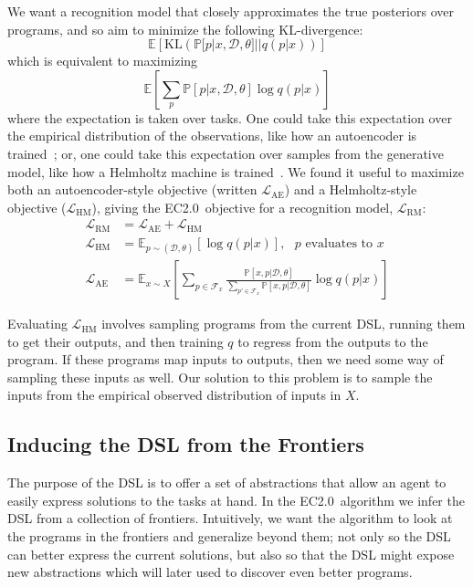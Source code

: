 \documentclass{article}
\newcommand{\system}{EC2.0~}
\newcommand{\expect}{\mathds{E}} %
\newcommand{\probability}{\mathds{P}} %
\begin{document}
We want a recognition model that closely approximates the true posteriors over programs, and so aim to minimize the following KL-divergence:
\begin{equation*}
  \expect\left[\text{KL}\left(\probability[p|x,\mathcal{D},\theta]||q(p|x) \right) \right]
\end{equation*}
which is equivalent to maximizing
$$
  \expect\left[\sum_p\probability[p|x,\mathcal{D},\theta]\log q(p|x) \right]
$$
  where the expectation is taken over tasks. One could take this expectation
  over the empirical distribution of the observations,
  like how an autoencoder is trained~\cite{hinton2006reducing}; or, one could take this expectation over samples from the generative model, like how a Helmholtz machine is trained~\cite{dayan1995helmholtz}.
  We found it useful to maximize both an autoencoder-style objective (written $\mathcal{L}_{\text{AE}}$) and a Helmholtz-style objective ($\mathcal{L}_{\text{HM}}$), giving the \system objective for a recognition model, $\mathcal{L}_{\text{RM}}$:
  \begin{align}
  \mathcal{L}_{\text{RM}}& = \mathcal{L}_\text{AE} + \mathcal{L}_\text{HM}\\
  \mathcal{L}_{\text{HM}}& = \expect_{p\sim(\mathcal{D},\theta) }\left[\log q(p|x)\right],\text{ $p$ evaluates to $x$}\nonumber\\
  \mathcal{L}_{\text{AE}}& = \expect_{x\sim X}\left[\sum_{p\in \mathcal{F}_x}
    \frac{\probability\left[x,p|\mathcal{D},\theta \right]}{\sum_{p'\in \mathcal{F}_x}\probability\left[x,p|\mathcal{D},\theta \right]}\log q(p|x)\right]\nonumber
  \end{align}

  Evaluating $\mathcal{L}_{\text{HM}}$ involves sampling programs from
  the current DSL, running them to get their outputs,
  and then training $q$ to regress from the outputs to the program.
  If these programs map inputs to outputs,
  then we need some way of sampling these inputs as well.
  Our solution to this problem is to sample the inputs
  from the empirical observed distribution of inputs in $X$.

\subsection{Inducing the DSL from the Frontiers}\label{grammarInductionSection}

The purpose of the DSL is to
offer a set of abstractions
that allow an agent to easily express solutions to the tasks at hand.
In the \system algorithm we infer the DSL from a collection of frontiers.
Intuitively, we want the algorithm to
look at the programs in the frontiers and
generalize beyond them; 
not only so the DSL can better express the current solutions,
but also so that the DSL might expose new abstractions
which will later used to
discover even better programs.
\end{document}
